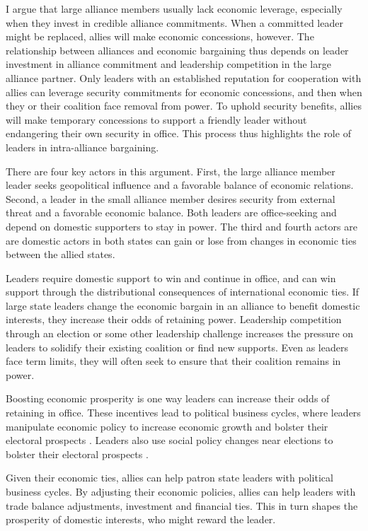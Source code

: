 \documentclass[12pt]{article}
\begin{document}
I argue that large alliance members usually lack economic leverage, especially when they invest in credible alliance commitments.
When a committed leader might be replaced, allies will make economic concessions, however. 
The relationship between alliances and economic bargaining thus depends on leader investment in alliance commitment and leadership competition in the large alliance partner.  
Only leaders with an established reputation for cooperation with allies can leverage security commitments for economic concessions, and then when they or their coalition face removal from power. 
To uphold security benefits, allies will make temporary concessions to support a friendly leader without endangering their own security in office. 
This process thus highlights the role of leaders in intra-alliance bargaining. 


There are four key actors in this argument. 
First, the large alliance member leader seeks geopolitical influence and a favorable balance of economic relations. 
Second, a leader in the small alliance member desires security from external threat and a favorable economic balance.
Both leaders are office-seeking and depend on domestic supporters to stay in power.
The third and fourth actors are are domestic actors in both states can gain or lose from changes in economic ties between the allied states. 


Leaders require domestic support to win and continue in office, and can win support through the distributional consequences of international economic ties. 
If large state leaders change the economic bargain in an alliance to benefit domestic interests, they increase their odds of retaining power. 
Leadership competition through an election or some other leadership challenge increases the pressure on leaders to solidify their existing coalition or find new supports. 
Even as leaders face term limits, they will often seek to ensure that their coalition remains in power. 


Boosting economic prosperity is one way leaders can increase their odds of retaining in office. 
These incentives lead to political business cycles, where leaders manipulate economic policy to increase economic growth and bolster their electoral prospects \citep{Rogoff1987, ClarkHallerberg2000}.
Leaders also use social policy changes near elections to bolster their electoral prospects \citep{Ahlquist2010, Philips2020}.  


Given their economic ties, allies can help patron state leaders with political business cycles. 
By adjusting their economic policies, allies can help leaders with trade balance adjustments, investment and financial ties.
This in turn shapes the prosperity of domestic interests, who might reward the leader.
\end{document}
